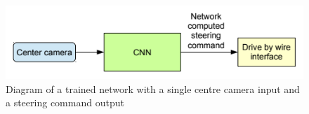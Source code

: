 \begin{figure}[ht]
 \centering 
 \includegraphics[width=\textwidth]{Figures/bojarski-nvidia.png}
 \caption{Diagram of a trained network with a single centre camera input and a steering command output}
 \label{fig:bojarski-net}
\end{figure}